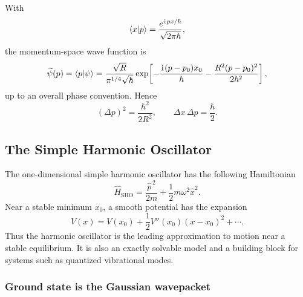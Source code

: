 With
\begin{equation}
 \langle{x|p}\rangle=\frac{e^{\hspace{1pt}\mathrm{i}\hspace{1pt} px/\hbar}}{\sqrt{2\pi\hbar}},
\end{equation}
the momentum-space wave function is
\begin{equation}
 \widetilde\psi(p)=\langle{p|\psi}\rangle
 =\frac{\sqrt R}{\pi^{1/4}\sqrt\hbar}
 \exp\!\left[-\frac{\hspace{1pt}\mathrm{i}\hspace{1pt}(p-p_0)x_0}{\hbar}
 -\frac{R^2(p-p_0)^2}{2\hbar^2}
\right],
\end{equation}
up to an overall phase convention. Hence
\begin{equation}
 (\Delta p)^2=\frac{\hbar^2}{2R^2},
 \qquad
 \boxed{\Delta x\,\Delta p=\frac{\hbar}{2}.}
\end{equation}

\subsection{The Simple Harmonic Oscillator}

The one-dimensional simple harmonic oscillator has the following Hamiltonian
\begin{equation}\label{sho hamiltonian}
 \hat H_{\mathrm{SHO}}
 =\frac{\hat p^{\,2}}{2m}+\frac12m\omega^2\hat x^2.
\end{equation}
Near a stable minimum $x_0$, a smooth potential has the expansion
\begin{equation}
 V(x)=V(x_0)+\frac12V''(x_0)(x-x_0)^2+\cdots.
\end{equation}
Thus the harmonic oscillator is the leading approximation to motion near a
stable equilibrium. It is also an exactly solvable model and a building
block for systems such as quantized vibrational modes.

\subsubsection{Ground state is the Gaussian wavepacket}

